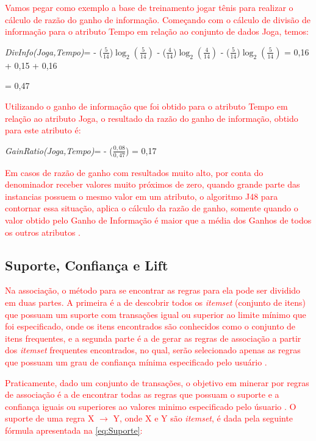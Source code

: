 \par
\textcolor{red}{Vamos pegar como exemplo a base de treinamento jogar tênis para realizar o cálculo de razão do ganho de informação. Começando com o cálculo de divisão de informação para o atributo Tempo em relação ao conjunto de dados Joga, temos:}

\textit{DivInfo(Joga,Tempo)}={ - ($\frac{5}{14}$)$\log_{2}(\frac{5}{14})$ - ($\frac{4}{14}$)$\log_{2}(\frac{4}{14})$ - ($\frac{5}{14}$)$\log_{2}(\frac{5}{14})$ = 0,16 + 0,15 + 0,16} 

= 0,47

\par
\textcolor{red}{Utilizando o ganho de informação que foi obtido para o atributo Tempo em relação ao atributo Joga, o resultado da razão do ganho de informação, obtido para este atributo é:}

\textit{GainRatio(Joga,Tempo)}={ - ($\frac{0,08}{0,47}$) = 0,17} 

\par
\textcolor{red}{Em casos de razão de ganho com resultados muito alto, por conta do denominador receber valores muito próximos de zero, quando grande parte das instancias possuem o mesmo valor em um atributo, o algoritmo J48 para contornar essa situação, aplica o cálculo da razão de ganho, somente quando o valor obtido pelo Ganho de Informação é maior que a média dos Ganhos de todos os outros atributos \cite{Carvalho2014}.}



\subsection{Suporte, Confiança e Lift}

\par
\textcolor{red}{Na associação, o método para se encontrar as regras para ela pode ser dividido em duas partes. A primeira é a de descobrir todos os \textit{itemset} (conjunto de itens) que possuam um suporte com transações igual ou superior ao limite mínimo que foi especificado, onde os itens encontrados são conhecidos como o conjunto de itens frequentes, e a segunda parte é a de gerar as regras de associação a partir dos \textit{itemset} frequentes encontrados, no qual, serão selecionado apenas as regras que possuam um grau de confiança mínima especificado pelo usuário \cite{Vasconcelos2004, LeandroSilva2014}.}

\textcolor{red}{Praticamente, dado um conjunto de transações, o objetivo em minerar por regras de associação é a de encontrar todas as regras que possuam o suporte e a confiança iguais ou superiores ao valores minimo especificado pelo úsuario \cite{Vasconcelos2004}. O suporte de uma regra X $\rightarrow$ Y, onde X e Y são  \textit{itemset}, é dada pela seguinte fórmula apresentada na \autoref{eq:Suporte}:}


